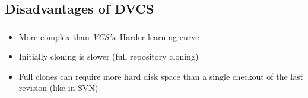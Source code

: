 \subsection{Disadvantages of DVCS}
\begin{frame}
  \frametitle{\insertsubsection}

  \begin{itemize}

  \item More complex than \textit{VCS's}. Harder learning curve
    \vspacing

  \item Initially cloning is slower (full repository cloning)
    \vspacing

  \item Full clones can require more hard disk space than a single
    checkout of the last revision (like in SVN)\vspacing

  \end{itemize}
\end{frame}


